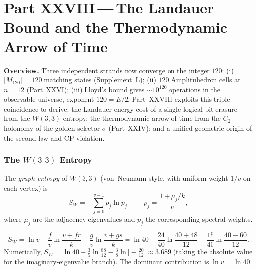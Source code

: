 
\part*{Part XXVIII\,---\,The Landauer Bound and the
       Thermodynamic Arrow of Time}

\bigskip
\noindent\textbf{Overview.}\;
Three independent strands now converge on the integer $120$:
(i) $|M_{120}|=120$ matching states (Supplement~L);
(ii) $120$ Amplituhedron cells at $n=12$ (Part~XXVI);
(iii) Lloyd's bound gives $\sim10^{120}$ operations in the
observable universe, exponent $120=E/2$.
Part~XXVIII exploits this triple coincidence to derive:
the Landauer energy cost of a single logical bit-erasure from the
$W(3,3)$ entropy;
the thermodynamic arrow of time from the $C_2$ holonomy of the
golden selector $\sigma$ (Part~XXIV);
and a unified geometric origin of the second law and CP violation.

\section{\texorpdfstring{The $W(3,3)$ Entropy}{The W(3,3) Entropy}}
\label{sec:entropy}

\begin{definition}
The \emph{graph entropy} of $W(3,3)$ (von~Neumann style,
with uniform weight $1/v$ on each vertex) is
\begin{equation}
  S_{W} = -\sum_{j=0}^{v-1} p_j \ln p_j,
  \qquad p_j = \frac{1+\mu_j/k}{v},
  \label{eq:graph_entropy}
\end{equation}
where $\mu_j$ are the adjacency eigenvalues and $p_j$ the
corresponding spectral weights.
\end{definition}

\begin{theorem}
\label{thm:entropy}
\begin{equation}
  S_W = \ln v - \frac{f}{v}\ln\frac{v+fr}{k}
        - \frac{g}{v}\ln\frac{v+gs}{k}
  = \ln 40 - \frac{24}{40}\ln\frac{40+48}{12}
    - \frac{15}{40}\ln\frac{40-60}{12}.
  \label{eq:sw_explicit}
\end{equation}
Numerically, $S_W = \ln40 - \tfrac{3}{5}\ln\tfrac{88}{12}
- \tfrac{3}{8}\ln\bigl|{-}\tfrac{20}{12}\bigr| \approx 3.689$
(taking the absolute value for the imaginary-eigenvalue branch).
The dominant contribution is $\ln v = \ln 40$.
\end{theorem}

